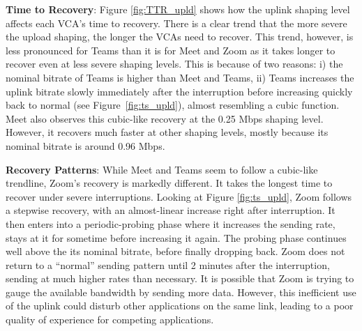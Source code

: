 \textbf{Time to Recovery}: Figure \ref{fig:TTR_upld} shows how the uplink shaping level affects each VCA's time to recovery. There is a clear trend that the more severe the upload shaping, the longer the VCAs need to recover. This trend, however, is less pronounced for Teams than it is for Meet and Zoom as it takes longer to recover even at less severe shaping levels. This is because of two reasons: i) the nominal bitrate of Teams is higher than Meet and Teams, ii)  Teams increases the uplink bitrate slowly immediately after the interruption before increasing quickly back to normal (see  Figure~\ref{fig:ts_upld}), almost resembling a cubic function. Meet also observes this cubic-like recovery at the 0.25 Mbps shaping level. However, it recovers much faster at other shaping levels, mostly because its nominal bitrate is around 0.96 Mbps. 

\textbf{Recovery Patterns}: While Meet and Teams seem to follow a cubic-like trendline, Zoom's recovery is markedly different. It takes the longest time to recover under severe interruptions. Looking at Figure \ref{fig:ts_upld}, Zoom follows a stepwise recovery, with an almost-linear increase right after interruption. It then enters into a periodic-probing phase where it increases the sending rate, stays at it for sometime before increasing it again. The probing phase continues well above the its nominal bitrate, before finally dropping back. Zoom does not return to a ``normal'' sending pattern until 2 minutes after the interruption, sending at much higher rates than necessary. It is possible that Zoom is trying to gauge the available bandwidth by sending more data. However, this inefficient use of the uplink could disturb other applications on the same link, leading to a poor quality of experience for competing applications. 

